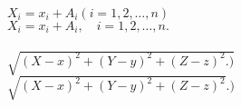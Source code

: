 \documentclass[a4paper,11pt]{article}
\begin{document}
\vspace{\spaceTwo}


\noindent
{} \\
\Jest $X_{ i } = x_{ i } + A_{ i } ( i = 1, 2, \ldots, n )$ \\
\Powin $X_{ i } = x_{ i } + A_{ i }, \quad i = 1, 2, \ldots, n.$ \\
 \\[0.2em]
\Jest $\sqrt{ ( X - x )^{ 2 } + ( Y - y )^{ 2 } + ( Z - z )^{ 2 } .) }$
\\[0.4em]
\Powin $\sqrt{ ( X - x )^{ 2 } + ( Y - y )^{ 2 } + ( Z - z )^{ 2 } }.)$
















{}






\end{document}

